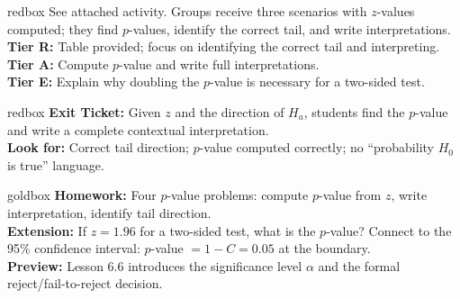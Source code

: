 \documentclass[10pt]{article}
\begin{document}
\begin{skillbox}{redbox}
    See attached activity. Groups receive three scenarios with $z$-values computed; they
    find $p$-values, identify the correct tail, and write interpretations.\\[4pt]
    \textbf{Tier R:} Table provided; focus on identifying the correct tail and interpreting.\\
    \textbf{Tier A:} Compute $p$-value and write full interpretations.\\
    \textbf{Tier E:} Explain why doubling the $p$-value is necessary for a two-sided test.
\end{skillbox}

\begin{skillbox}{redbox}
    \textbf{Exit Ticket:} Given $z$ and the direction of $H_a$, students find the $p$-value
    and write a complete contextual interpretation. \\[4pt]
    \textbf{Look for:} Correct tail direction; $p$-value computed correctly; no ``probability
    $H_0$ is true'' language.
\end{skillbox}

\begin{skillbox}{goldbox}
    \textbf{Homework:} Four $p$-value problems: compute $p$-value from $z$, write interpretation,
    identify tail direction. \\[4pt]
    \textbf{Extension:} If $z = 1.96$ for a two-sided test, what is the $p$-value? Connect
    to the 95\% confidence interval: $p$-value $= 1 - C = 0.05$ at the boundary.\\[4pt]
    \textbf{Preview:} Lesson 6.6 introduces the significance level $\alpha$ and the formal
    reject/fail-to-reject decision.
\end{skillbox}
\end{document}
